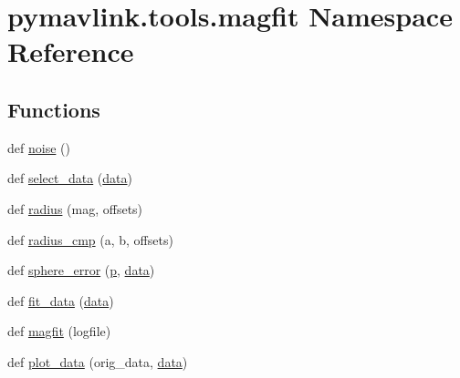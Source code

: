 \hypertarget{namespacepymavlink_1_1tools_1_1magfit}{}\section{pymavlink.\+tools.\+magfit Namespace Reference}
\label{namespacepymavlink_1_1tools_1_1magfit}
\subsection*{Functions}
\begin{DoxyCompactItemize}
\item 
def \mbox{\hyperlink{namespacepymavlink_1_1tools_1_1magfit_a1ac824bd9533f61b3719628394a63f71}{noise}} ()
\item 
def \mbox{\hyperlink{namespacepymavlink_1_1tools_1_1magfit_ae5cfb18d0ec8a01c11dd00ef0a2d8a40}{select\+\_\+data}} (\mbox{\hyperlink{structdata}{data}})
\item 
def \mbox{\hyperlink{namespacepymavlink_1_1tools_1_1magfit_a62287ea1457f17318d050e233a94c7d9}{radius}} (mag, offsets)
\item 
def \mbox{\hyperlink{namespacepymavlink_1_1tools_1_1magfit_aecea0b6954ec65248c3cd767cae448eb}{radius\+\_\+cmp}} (a, b, offsets)
\item 
def \mbox{\hyperlink{namespacepymavlink_1_1tools_1_1magfit_ae6c075abeaba6f6da5ea3023a1f136da}{sphere\+\_\+error}} (\mbox{\hyperlink{velTest_8cpp_a739e18b8b6d072d434ebcb6ca486abb0}{p}}, \mbox{\hyperlink{structdata}{data}})
\item 
def \mbox{\hyperlink{namespacepymavlink_1_1tools_1_1magfit_a6319a159948ba8c06e42b01fc3ce3ffc}{fit\+\_\+data}} (\mbox{\hyperlink{structdata}{data}})
\item 
def \mbox{\hyperlink{namespacepymavlink_1_1tools_1_1magfit_a91167174e4e89e986413000d1117081c}{magfit}} (logfile)
\item 
def \mbox{\hyperlink{namespacepymavlink_1_1tools_1_1magfit_a2689a4d34638be4aa45cf5592cc70b3f}{plot\+\_\+data}} (orig\+\_\+data, \mbox{\hyperlink{structdata}{data}})
\end{DoxyCompactItemize}
